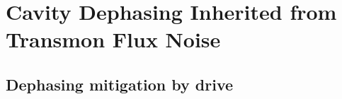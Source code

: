 \chapter{Cavity Dephasing Inherited from Transmon Flux Noise}
\label{chap:cavity_dephasing}






\section{Dephasing mitigation by drive}
\label{sec2}


